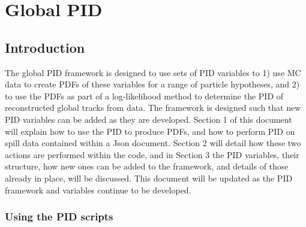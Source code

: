 \chapter{Global PID}
\label{chapter:globalpid}

\section{Introduction}
\label{pid_intro}

The global PID framework is designed to use sets of PID variables to 1) use MC data to create PDFs of these variables for a range of particle hypotheses, and 2) to use the PDFs as part of a log-likelihood method to determine the PID of reconstructed global tracks from data. The framework is designed such that new PID variables can be added as they are developed. Section 1 of this document will explain how to use the PID to produce PDFs, and how to perform PID on spill data contained within a Json document. Section 2 will detail how these two actions are performed within the code, and in Section 3 the PID variables, their structure, how new ones can be added to the framework, and details of those already in place, will be discussed. This document will be updated as the PID framework and variables continue to be developed.

\subsection{Using the PID scripts}
\label{pid_usage}

